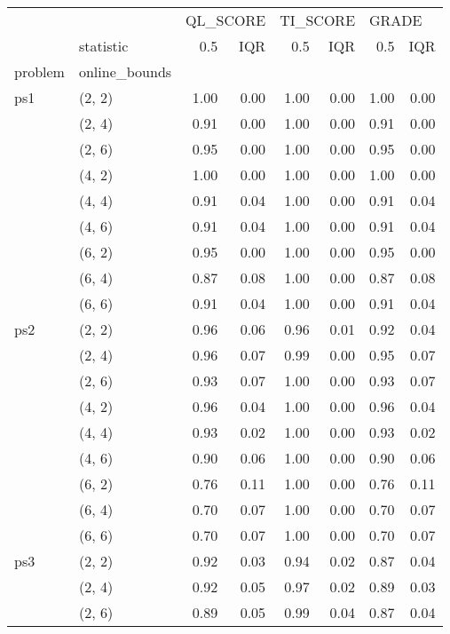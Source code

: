 \begin{tabular}{llrrrrrr}
\toprule
    & {} & \multicolumn{2}{l}{QL\_SCORE} & \multicolumn{2}{l}{TI\_SCORE} & \multicolumn{2}{l}{GRADE} \\
    & statistic &      0.5 &  IQR &      0.5 &  IQR &   0.5 &  IQR \\
problem & online\_bounds &          &      &          &      &       &      \\
\midrule
ps1 & (2, 2) &     1.00 & 0.00 &     1.00 & 0.00 &  1.00 & 0.00 \\
    & (2, 4) &     0.91 & 0.00 &     1.00 & 0.00 &  0.91 & 0.00 \\
    & (2, 6) &     0.95 & 0.00 &     1.00 & 0.00 &  0.95 & 0.00 \\
    & (4, 2) &     1.00 & 0.00 &     1.00 & 0.00 &  1.00 & 0.00 \\
    & (4, 4) &     0.91 & 0.04 &     1.00 & 0.00 &  0.91 & 0.04 \\
    & (4, 6) &     0.91 & 0.04 &     1.00 & 0.00 &  0.91 & 0.04 \\
    & (6, 2) &     0.95 & 0.00 &     1.00 & 0.00 &  0.95 & 0.00 \\
    & (6, 4) &     0.87 & 0.08 &     1.00 & 0.00 &  0.87 & 0.08 \\
    & (6, 6) &     0.91 & 0.04 &     1.00 & 0.00 &  0.91 & 0.04 \\
ps2 & (2, 2) &     0.96 & 0.06 &     0.96 & 0.01 &  0.92 & 0.04 \\
    & (2, 4) &     0.96 & 0.07 &     0.99 & 0.00 &  0.95 & 0.07 \\
    & (2, 6) &     0.93 & 0.07 &     1.00 & 0.00 &  0.93 & 0.07 \\
    & (4, 2) &     0.96 & 0.04 &     1.00 & 0.00 &  0.96 & 0.04 \\
    & (4, 4) &     0.93 & 0.02 &     1.00 & 0.00 &  0.93 & 0.02 \\
    & (4, 6) &     0.90 & 0.06 &     1.00 & 0.00 &  0.90 & 0.06 \\
    & (6, 2) &     0.76 & 0.11 &     1.00 & 0.00 &  0.76 & 0.11 \\
    & (6, 4) &     0.70 & 0.07 &     1.00 & 0.00 &  0.70 & 0.07 \\
    & (6, 6) &     0.70 & 0.07 &     1.00 & 0.00 &  0.70 & 0.07 \\
ps3 & (2, 2) &     0.92 & 0.03 &     0.94 & 0.02 &  0.87 & 0.04 \\
    & (2, 4) &     0.92 & 0.05 &     0.97 & 0.02 &  0.89 & 0.03 \\
    & (2, 6) &     0.89 & 0.05 &     0.99 & 0.04 &  0.87 & 0.04 \\

\end{tabular}
